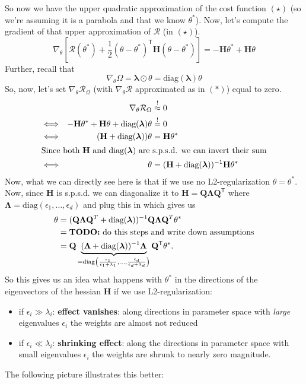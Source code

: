 \documentclass[a2paper,4pt]{extarticle}
\newcommand{\cR}{\mathcal{R}}
\newcommand*{\T}{\mathsf{T}}
\newcommand{\diag}{\text{diag}}
\newcommand{\mbeq}{\stackrel{!}{=}}
\newcommand{\mat}[1]{\mathbf{#1}}
\newcommand{\vlambda}{\boldsymbol{\lambda}}
\newcommand{\MH}{\mat{H}}
\newcommand{\MQ}{\mat{Q}}
\newcommand{\MLambda}{\mat{\Lambda}}
\newcommand{\todo}[1]{\textbf{TODO:} #1}
\newcommand{\todo}[1]{%
}
\begin{document}
\begin{landscape}
\begin{multicols*}{7}
So now we have the upper quadratic approximation of the cost function
$(\star)$ (so we're assuming it is a parabola and that we know $\theta^*$). Now,
let's compute the gradient of that upper approximation of $\cR$ (in $(\star)$).
\[
\nabla_{\theta}\left[
\cR(\theta^*)
+
\frac{1}{2}(\theta-\theta^*)^\T\MH(\theta-\theta^*)
\right]
=
-\MH\theta^* +\MH\theta
\tag{*}
\]
Further, recall that
\[
\nabla_{\theta}\Omega
=
\vlambda\odot\theta
=
\diag(\vlambda)\theta
\]
So, now, let's set $\nabla_{\theta}\cR_{\Omega}$ (with $\nabla_{\theta}\cR$ 
approximated as in $(*)$) equal to zero.
\begin{align*}
&&
\nabla_{\theta}\cR_{\Omega}
&\stackrel{!}{\approx} 
0
\\
&\Longleftrightarrow&
-\MH\theta^*+\MH\theta
+\diag(\vlambda)\theta
&\mbeq 0
\\
&\Longleftrightarrow&
(\MH +\diag(\vlambda))\theta
&=
\MH\theta^*
\\
\shortintertext{Since both $\MH$ and $\diag(\vlambda)$ are s.p.s.d. we can
invert their sum} 
&\Longleftrightarrow&
\theta
&=
(\MH +\diag(\vlambda))^{-1}
\MH\theta^*
\end{align*}
Now, what we can directly see here is that if we use no L2-regularization
$\theta=\theta^*$. Now, since $\MH$ is s.p.s.d. we can diagonalize it to
$\MH=\MQ\MLambda\MQ^\T$ where $\MLambda=\diag(\epsilon_1,\ldots,\epsilon_d)$ and
plug this in which gives us
\begin{align*}
\theta
&=
(\MQ\MLambda\MQ^T +\diag(\vlambda))^{-1}
\MQ\MLambda\MQ^T\theta^*
\\
&=\text{\todo{do this steps and write down assumptions}}
\\
&=\MQ\underbrace{(\MLambda+\diag(\vlambda))^{-1}\MLambda}_{
=\diag\left(
\frac{\epsilon_1}{\epsilon_1+\lambda_1},
\ldots, 
\frac{\epsilon_d}{\epsilon_d+\lambda_d}\right)
}\MQ^\T\theta^*.
\end{align*}
So this gives us an idea what happens with $\theta^*$ in the directions of the
eigenvectors of the hessian $\MH$ if we use L2-regularization:
\begin{itemize}
  \item if $\epsilon_i\gg\lambda_i$: \textbf{effect vanishes}: along directions
  in parameter space with \emph{large} eigenvalues $\epsilon_i$ the weights are
  almost not reduced
  \item if $\epsilon_i\ll\lambda_i$: \textbf{shrinking effect}: along the
  directions in parameter space with small eigenvalues $\epsilon_i$ the weights
  are shrunk to nearly zero magnitude.
\end{itemize}
The following picture illustrates this better:


\end{multicols*}
\end{landscape}
\end{document}
